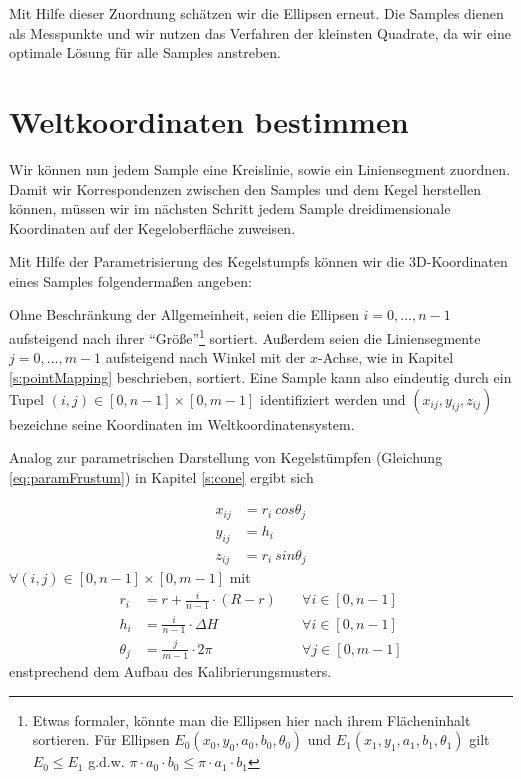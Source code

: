 Mit Hilfe dieser Zuordnung schätzen wir die Ellipsen erneut. Die Samples dienen als Messpunkte und wir nutzen das Verfahren der kleinsten Quadrate, da wir eine optimale Lösung für alle Samples anstreben.

\section{Weltkoordinaten bestimmen}
Wir können nun jedem Sample eine Kreislinie, sowie ein Liniensegment zuordnen. Damit wir Korrespondenzen zwischen den Samples und dem Kegel herstellen können, müssen wir im nächsten Schritt jedem Sample dreidimensionale Koordinaten auf der Kegeloberfläche zuweisen.

Mit Hilfe der Parametrisierung des Kegelstumpfs können wir die 3D-Koordinaten eines Samples folgendermaßen angeben:

Ohne Beschränkung der Allgemeinheit, seien die Ellipsen $i = 0,\dotsc,n - 1$ aufsteigend nach ihrer "`Größe"'\footnote{Etwas formaler, könnte man die Ellipsen hier nach ihrem Flächeninhalt sortieren. Für Ellipsen $E_0(x_0,y_0,a_0, b_0, \theta_0)$ und $E_1(x_1,y_1,a_1, b_1,\theta_1)$ gilt $E_0 \leq E_1$ g.d.w. $\pi\cdot a_0 \cdot b_0 \leq \pi \cdot a_1 \cdot b_1$} sortiert.
Außerdem seien die Liniensegmente $j = 0,\dotsc,m - 1$ aufsteigend nach Winkel mit der $x$-Achse, wie in Kapitel \ref{s:pointMapping} beschrieben, sortiert.
Eine Sample kann also eindeutig durch ein Tupel $(i,j) \in [0,n-1]\times [0,m-1]$ identifiziert werden und $(x_{ij},y_{ij},z_{ij})$ bezeichne seine Koordinaten im Weltkoordinatensystem.

Analog zur parametrischen Darstellung von Kegelstümpfen (Gleichung \ref{eq:paramFrustum}) in Kapitel \ref{s:cone} ergibt sich

\[
\begin{aligned}
x_{ij} &= r_i~cos \theta_j \\
y_{ij} &= h_i\\
z_{ij} &= r_i~sin \theta_j
\end{aligned}
\]
$\forall (i,j) \in [0,n-1]\times [0,m-1]$ mit
\[
\begin{aligned}
r_i &= r + \frac{i}{n - 1}\cdot(R - r) \quad&\forall i\in[0,n-1]\\
h_i &= \frac{i}{n - 1}\cdot\Delta H &\forall i\in[0,n-1]\\
\theta_j &= \frac{j}{m-1} \cdot  2\pi  &\forall j\in[0,m-1]
\end{aligned}
\] %
enstprechend dem Aufbau des Kalibrierungsmusters.



